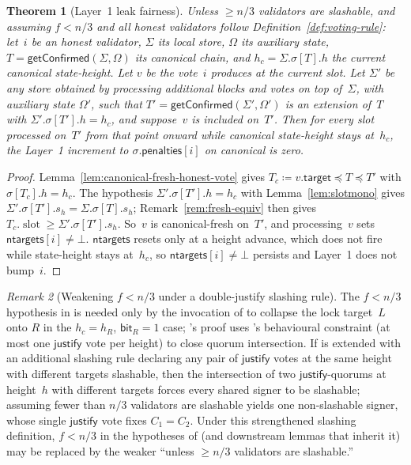 \ifx\litemode\undefined\documentclass{article}\fi
\newcommand{\slot}[0]{\ensuremath{\operatorname{\mathrm{slot}}}}
\newcommand{\target}{\mathsf{target}}
\newcommand{\just}{\ensuremath{\mathsf{justify}}\xspace}
\newcommand{\ntargets}{\mathsf{ntargets}}
\newcommand{\penalties}{\mathsf{penalties}}
\newcommand{\bit}{\mathsf{bit}}
\newcommand{\getConfirmed}{\textsf{getConfirmed}\xspace}
\theoremstyle{plain}
\newtheorem{theorem}{Theorem}
\theoremstyle{definition}
\theoremstyle{remark}
\newtheorem{remark}[theorem]{Remark}
\begin{document}
\begin{theorem}[Layer~1 leak fairness]\label{thm:fairness}
Unless $\geq n/3$ validators are slashable, and assuming $f < n/3$ and all honest validators follow Definition~\ref{def:voting-rule}: let~$i$ be an honest validator, $\Sigma$ its local store, $\Omega$ its auxiliary state, $T = \getConfirmed(\Sigma, \Omega)$ its canonical chain, and $h_c = \Sigma.\sigma[T].h$ the current canonical state-height.
Let $v$ be the vote~$i$ produces at the current slot.
Let $\Sigma'$ be any store obtained by processing additional blocks and votes on top of~$\Sigma$, with auxiliary state $\Omega'$, such that $T' = \getConfirmed(\Sigma', \Omega')$ is an extension of~$T$ with $\Sigma'.\sigma[T'].h = h_c$, and suppose~$v$ is included on~$T'$.
Then for every slot processed on~$T'$ from that point onward while canonical state-height stays at~$h_c$, the Layer~1 increment to $\sigma.\penalties[i]$ on canonical is zero.
\end{theorem}

\begin{proof}
Lemma~\ref{lem:canonical-fresh-honest-vote} gives $T_c \coloneqq v.\target \preceq T \preceq T'$ with $\sigma[T_c].h = h_c$.
The hypothesis $\Sigma'.\sigma[T'].h = h_c$ with Lemma~\ref{lem:slotmono} gives $\Sigma'.\sigma[T'].s_h = \Sigma.\sigma[T].s_h$; Remark~\ref{rem:fresh-equiv} then gives $T_c.\slot \geq \Sigma'.\sigma[T'].s_h$.
So~$v$ is canonical-fresh on~$T'$, and processing~$v$ sets $\ntargets[i] \neq \bot$.
$\ntargets$ resets only at a height advance, which does not fire while state-height stays at~$h_c$, so $\ntargets[i] \neq \bot$ persists and Layer~1 does not bump~$i$.
\end{proof}

\begin{remark}[Weakening $f < n/3$ under a double-justify slashing rule]\label{rem:canonical-fresh-slashable}
The $f < n/3$ hypothesis in  is needed only by the invocation of  to collapse the lock target~$L$ onto $R$ in the $h_c = h_R$, $\bit_R = 1$ case; 's proof uses 's behavioural constraint (at most one \just vote per height) to close quorum intersection.
If  is extended with an additional slashing rule declaring any pair of \just votes at the same height with different targets slashable, then the intersection of two \just-quorums at height~$h$ with different targets forces every shared signer to be slashable; assuming fewer than $n/3$ validators are slashable yields one non-slashable signer, whose single \just vote fixes $C_1 = C_2$.
Under this strengthened slashing definition, $f < n/3$ in the hypotheses of  (and downstream lemmas that inherit it) may be replaced by the weaker ``unless $\geq n/3$ validators are slashable.''
\end{remark}
\end{document}
